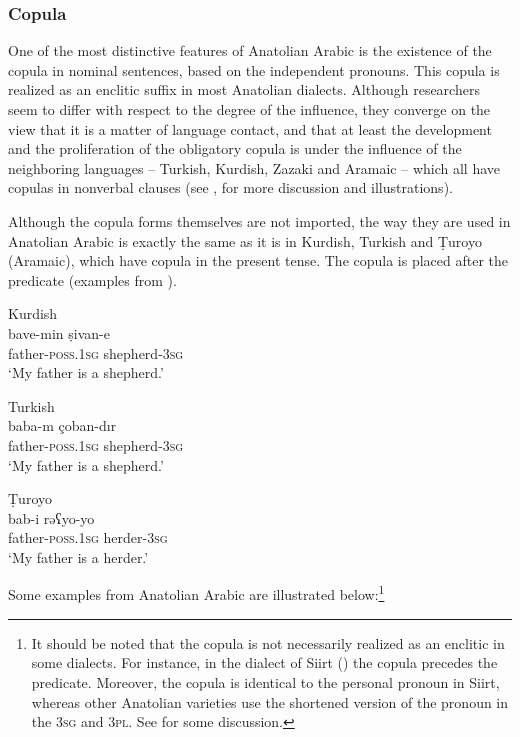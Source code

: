 \documentclass[output=paper]{langsci/langscibook}
\begin{document}
\subsubsection{Copula}
One of the most distinctive features of Anatolian Arabic is the existence of the copula in nominal sentences, based on the independent pronouns. This copula is realized as an enclitic suffix in most Anatolian dialects. Although researchers seem to differ with respect to the degree of the influence, they converge on the view that it is a matter of language contact, and that at least the development and the proliferation of the obligatory copula is under the influence of the neighboring languages -- Turkish, Kurdish, Zazaki and Aramaic -- which all have copulas in nonverbal clauses (see \citealt{Lahdo2009,Grigore2007article,Palva2011,Talay2007,Jastrow2011anatolian,Akkus2016,Akkus2017,AkkusBenmamoun2018}, for more discussion and illustrations). 

Although the copula forms themselves are not imported, the way they are used in Anatolian Arabic is exactly the same as it is in Kurdish, Turkish and Ṭuroyo (Aramaic), which have copula in the present tense. The copula is placed after the predicate (examples from \citealt{Grigore2007article}).  

\begin{exe}
\ex \label{cop} 
		\begin{xlist}
		\ex Kurdish \\\label{copkrm}\gll bave-min ṣivan-e		\\
    father-\textsc{poss.1sg}		shepherd-\textsc{3sg} \\
       \glt `My father is a shepherd.'

	\ex Turkish \\
	\label{coptk} \gll baba-m 		çoban-dır\\
	father-\textsc{poss.1sg}		shepherd-\textsc{3sg}\\
        \glt  `My father is a shepherd.'
	
		\ex Ṭuroyo\\ \label{copara} \gll  bab-i		rəʕyo-yo\\
		father-\textsc{poss.1sg}		herder-\textsc{3sg}\\
      \glt  `My father is a herder.'
        \end{xlist}
      
\end{exe}

\noindent Some examples from Anatolian Arabic are illustrated below:\footnote{It should be noted that the copula is not necessarily realized as an enclitic in some dialects. For instance, in the dialect of 
Siirt (\citealt{Jastrow2011anatolian}) the copula precedes the
predicate. Moreover, the copula is identical to the personal pronoun in Siirt, whereas other Anatolian varieties use the shortened version of the pronoun in the 3\textsc{sg} and 3\textsc{pl}. See \cite{Akkus2016} for some discussion. }
\end{document}
